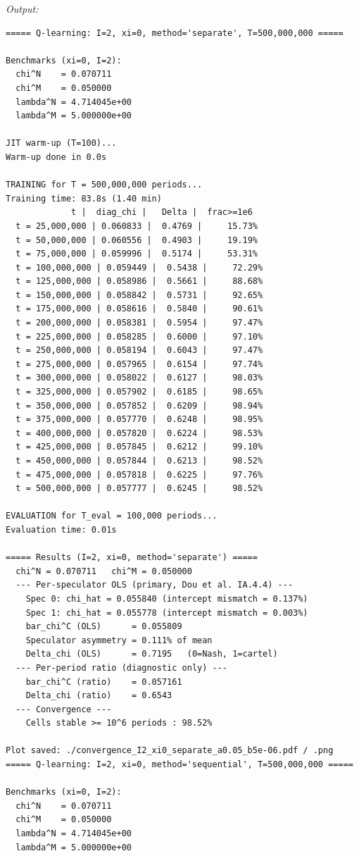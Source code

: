 \noindent\textit{Output:}
\begin{lstlisting}[style=outputstyle]
===== Q-learning: I=2, xi=0, method='separate', T=500,000,000 =====

Benchmarks (xi=0, I=2):
  chi^N    = 0.070711
  chi^M    = 0.050000
  lambda^N = 4.714045e+00
  lambda^M = 5.000000e+00

JIT warm-up (T=100)...
Warm-up done in 0.0s

TRAINING for T = 500,000,000 periods...
Training time: 83.8s (1.40 min)
             t |  diag_chi |   Delta |  frac>=1e6
  t = 25,000,000 | 0.060833 |  0.4769 |     15.73%
  t = 50,000,000 | 0.060556 |  0.4903 |     19.19%
  t = 75,000,000 | 0.059996 |  0.5174 |     53.31%
  t = 100,000,000 | 0.059449 |  0.5438 |     72.29%
  t = 125,000,000 | 0.058986 |  0.5661 |     88.68%
  t = 150,000,000 | 0.058842 |  0.5731 |     92.65%
  t = 175,000,000 | 0.058616 |  0.5840 |     90.61%
  t = 200,000,000 | 0.058381 |  0.5954 |     97.47%
  t = 225,000,000 | 0.058285 |  0.6000 |     97.10%
  t = 250,000,000 | 0.058194 |  0.6043 |     97.47%
  t = 275,000,000 | 0.057965 |  0.6154 |     97.74%
  t = 300,000,000 | 0.058022 |  0.6127 |     98.03%
  t = 325,000,000 | 0.057902 |  0.6185 |     98.65%
  t = 350,000,000 | 0.057852 |  0.6209 |     98.94%
  t = 375,000,000 | 0.057770 |  0.6248 |     98.95%
  t = 400,000,000 | 0.057820 |  0.6224 |     98.53%
  t = 425,000,000 | 0.057845 |  0.6212 |     99.10%
  t = 450,000,000 | 0.057844 |  0.6213 |     98.52%
  t = 475,000,000 | 0.057818 |  0.6225 |     97.76%
  t = 500,000,000 | 0.057777 |  0.6245 |     98.52%

EVALUATION for T_eval = 100,000 periods...
Evaluation time: 0.01s

===== Results (I=2, xi=0, method='separate') =====
  chi^N = 0.070711   chi^M = 0.050000
  --- Per-speculator OLS (primary, Dou et al. IA.4.4) ---
    Spec 0: chi_hat = 0.055840 (intercept mismatch = 0.137%)
    Spec 1: chi_hat = 0.055778 (intercept mismatch = 0.003%)
    bar_chi^C (OLS)      = 0.055809
    Speculator asymmetry = 0.111% of mean
    Delta_chi (OLS)      = 0.7195   (0=Nash, 1=cartel)
  --- Per-period ratio (diagnostic only) ---
    bar_chi^C (ratio)    = 0.057161
    Delta_chi (ratio)    = 0.6543
  --- Convergence ---
    Cells stable >= 10^6 periods : 98.52%

Plot saved: ./convergence_I2_xi0_separate_a0.05_b5e-06.pdf / .png
===== Q-learning: I=2, xi=0, method='sequential', T=500,000,000 =====

Benchmarks (xi=0, I=2):
  chi^N    = 0.070711
  chi^M    = 0.050000
  lambda^N = 4.714045e+00
  lambda^M = 5.000000e+00


\end{lstlisting}
